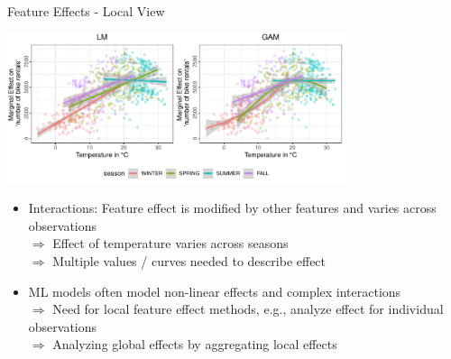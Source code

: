 \documentclass[11pt,compress,t,notes=noshow, aspectratio=169, xcolor=table]{beamer}
\begin{document}
\begin{frame}{Feature Effects - Local View}

\centerline{\includegraphics[width=0.75\textwidth, trim=0cm 0.1cm 0cm 0cm, clip]{figure/lm_main_interactions}}

\begin{itemize}
    \item Interactions: Feature effect is modified by other features and varies across observations \\ 
    $\Rightarrow$ Effect of temperature varies across seasons\\
    $\Rightarrow$ Multiple values / curves needed to describe effect
    \item ML models often model non-linear effects and complex interactions \\
    $\Rightarrow$ Need for local feature effect methods, e.g., analyze effect for individual observations\\
    $\Rightarrow$ Analyzing global effects by aggregating local effects
\end{itemize}




\end{frame}
\end{document}
